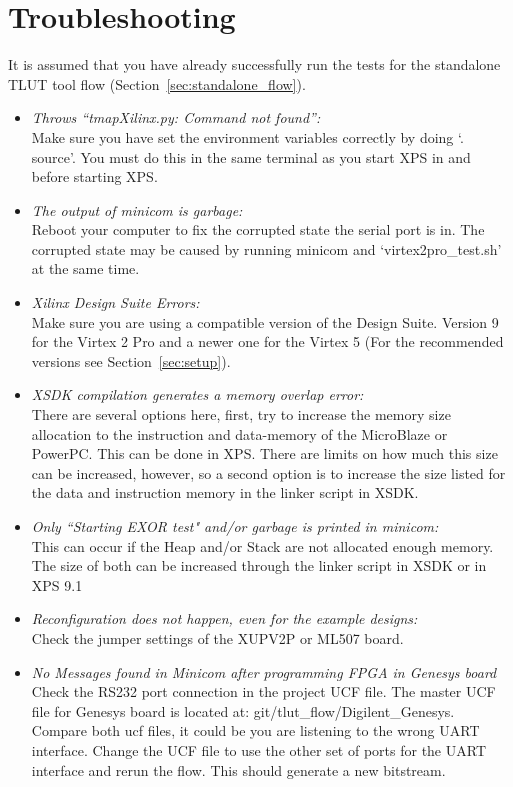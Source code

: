 \documentclass[a4paper,oneside]{memoir}
\begin{document}
\begin{itemize}
\end{itemize}

\section{Troubleshooting}\label{sec:xilinx_troubleshooting}


It is assumed that you have already successfully run the tests for the standalone TLUT tool flow (Section~\ref{sec:standalone_flow}).

\begin{itemize}
\item \emph{Throws ``tmapXilinx.py: Command not found'':}\\
Make sure you have set the environment variables correctly by doing `. source'. You must do this in the same terminal as you start XPS in and before starting XPS.
\item \emph{The output of minicom is garbage:}\\
Reboot your computer to fix the corrupted state the serial port is in. The corrupted state may be caused by running minicom and `virtex2pro\_test.sh' at the same time.
\item \emph{Xilinx Design Suite Errors:}\\
Make sure you are using a compatible version of the Design Suite. Version 9 for the Virtex 2 Pro and a newer one for the Virtex 5 (For the recommended versions see Section~\ref{sec:setup}).
\item \emph{XSDK compilation generates a memory overlap error:}\\
There are several options here, first, try to increase the memory size allocation to the instruction and data-memory of the MicroBlaze or PowerPC. This can be done in XPS. There are limits on how much this size can be increased, however, so a second option is to increase the size listed for the data and instruction memory in the linker script in XSDK. 
\item \emph{Only ``Starting EXOR test" and/or garbage is printed in minicom:}\\
This can occur if the Heap and/or Stack are not allocated enough memory. The size of both can be increased through the linker script in XSDK or in XPS 9.1
\item \emph{Reconfiguration does not happen, even for the example designs:}\\
Check the jumper settings of the XUPV2P or ML507 board.
\item \emph{No Messages found in Minicom after programming FPGA in Genesys board}\\
Check the RS232 port connection in the project UCF file. The master UCF file for Genesys board is located at: git/tlut\_flow/Digilent\_Genesys. Compare both ucf files, it could be you are listening to the wrong UART interface. Change the UCF file to use the other set of ports for the UART interface and rerun the flow. This should generate a new bitstream.
\end{itemize}
\end{document}
